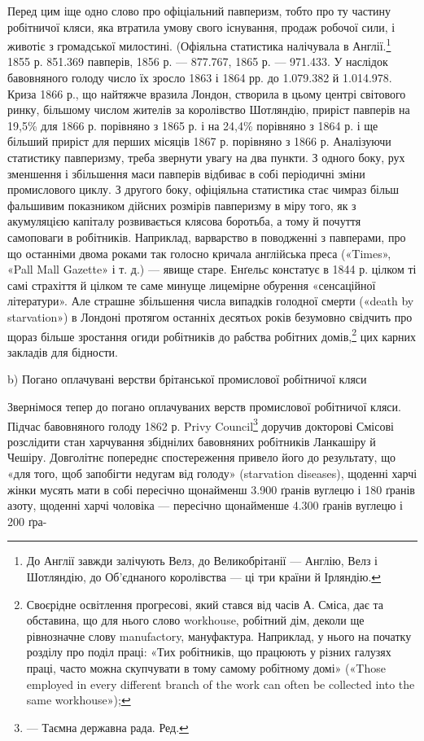 Перед цим іще одно слово про офіціальний павперизм, тобто
про ту частину робітничої кляси, яка втратила умову свого існування,
продаж робочої сили, і животіє з громадської милостині.
(Офіяльна статистика налічувала в Англії.\footnote{
До Англії завжди залічують Велз, до Великобрітанії — Англію,
Велз і Шотляндію, до Об’єднаного королівства — ці три країни й Ірляндію.
} 1855 р. 851.369 павперів,
1856 р. — 877.767, 1865 р. — 971.433. У наслідок бавовняного
голоду число їх зросло 1863 і 1864 рр. до 1.079.382
й 1.014.978. Криза 1866 р., що найтяжче вразила Лондон, створила
в цьому центрі світового ринку, більшому числом жителів
за королівство Шотляндію, приріст павперів на 19,5\% для
1866 р. порівняно з 1865 р. і на 24,4\% порівняно з 1864 р. і ще
більший приріст для перших місяців 1867 р. порівняно з
1866 р. Аналізуючи статистику павперизму, треба звернути увагу
на два пункти. З одного боку, рух зменшення і збільшення маси
павперів відбиває в собі періодичні зміни промислового циклу.
З другого боку, офіціяльна статистика стає чимраз більш фальшивим
показником дійсних розмірів павперизму в міру того,
як з акумуляцією капіталу розвивається клясова боротьба, а
тому й почуття самоповаги в робітників. Наприклад, варварство
в поводженні з павперами, про що останніми двома роками так
голосно кричала англійська преса («Times», «Pall Mall Gazette»
і т. д.) — явище старе. Енґельс констатує в 1844 р. цілком
ті самі страхіття й цілком те саме минуще лицемірне обурення
«сенсаційної літератури». Але страшне збільшення числа випадків
голодної смерти («death by starvation») в Лондоні протягом
останніх десятьох років безумовно свідчить про щораз більше зростання
огиди робітників до рабства робітних домів,\footnote{
Своєрідне освітлення прогресові, який стався від часів А. Сміса,
дає та обставина, що для нього слово workhouse, робітний дім, деколи ще
рівнозначне слову manufactory, мануфактура. Наприклад, у нього на
початку розділу про поділ праці: «Тих робітників, що працюють у різних
галузях праці, часто можна скупчувати в тому самому робітному домі»
(«Those employed in every different branch of the work can often be collected
into the same workhouse»);
} цих карних
закладів для бідности.

b) Погано оплачувані верстви брітанської промислової робітничої кляси

Звернімося тепер до погано оплачуваних верств промислової
робітничої кляси. Підчас бавовняного голоду 1862 р. Privy
Council\footnote*{
— Таємна державна рада. Ред.
} доручив докторові Смісові розслідити стан харчування
збіднілих бавовняних робітників Ланкашіру й Чешіру. Довголітнє
попереднє спостереження привело його до результату, що
«для того, щоб запобігти недугам від голоду» (starvation diseases),
щоденні харчі жінки мусять мати в собі пересічно щонайменш
3.900 ґранів вуглецю і 180 ґранів азоту, щоденні харчі
чоловіка — пересічно щонайменше 4.300 ґранів вуглецю і 200 ґра-